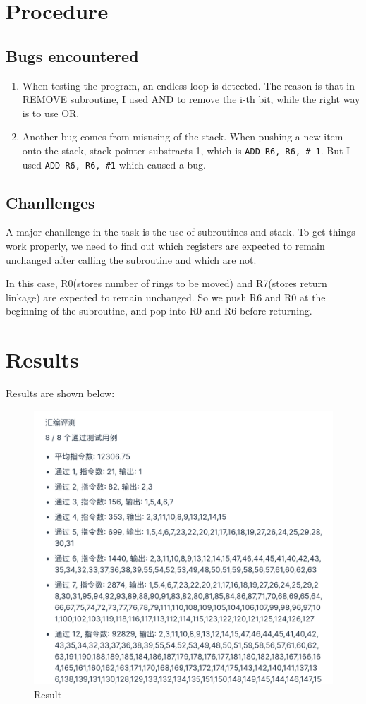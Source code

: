 \documentclass[UTF8]{ctexart}
\begin{document}
\section{Procedure}
\subsection{Bugs encountered}
\begin{enumerate}
  \item When testing the program, an endless loop is detected. The reason is that in REMOVE subroutine,
  I used AND to remove the i-th bit, while the right way is to use OR.
  \item Another bug comes from misusing of the stack. When pushing a new item onto the stack,
   stack pointer substracts 1, which is \lstinline{ADD R6, R6, #-1}. But I used \lstinline{ADD R6, R6, #1}
   which caused a bug.
\end{enumerate}

\subsection{Chanllenges}
A major chanllenge in the task is the use of subroutines and stack. To get things work properly, 
we need to find out which registers are expected to remain unchanged after calling the subroutine and which are not.

In this case, R0(stores number of rings to be moved) and R7(stores return linkage) are expected to remain unchanged.
So we push R6 and R0 at the beginning of the subroutine, and pop into R0 and R6 before returning.
\clearpage
\section{Results}
Results are shown below:
\begin{figure}[h]
        \centering
        \includegraphics[scale=0.5]{result.png}
        \caption{Result}
\end{figure}


\end{document}
